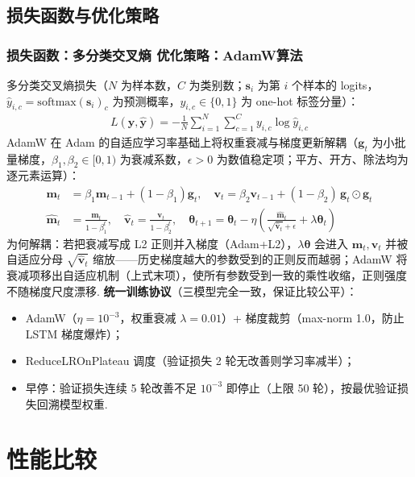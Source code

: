 \documentclass{模版}
\begin{document}
\subsection{损失函数与优化策略}
\begin{frame}\frametitle{损失函数：多分类交叉熵 \quad 优化策略：AdamW算法}
{\fontsize{9pt}{11pt}\selectfont 多分类交叉熵损失（$N$ 为样本数，$C$ 为类别数；$\symbf{s}_i$ 为第 $i$ 个样本的 logits，$\hat{y}_{i,c}=\mathrm{softmax}(\symbf{s}_i)_c$ 为预测概率，$y_{i,c}\in\{0,1\}$ 为 one-hot 标签分量）：}
\begin{align*}
L(\symbf{y}, \hat{\symbf{y}}) = - \frac{1}{N} \sum_{i=1}^{N} \sum_{c=1}^{C} y_{i,c} \log \hat{y}_{i,c}
\end{align*}
{\fontsize{9pt}{11pt}\selectfont AdamW 在 Adam 的自适应学习率基础上将权重衰减与梯度更新解耦（$\symbf{g}_t$ 为小批量梯度，$\beta_1,\beta_2\in[0,1)$ 为衰减系数，$\epsilon>0$ 为数值稳定项；平方、开方、除法均为逐元素运算）：}
\begin{align*}
\symbf{m}_t &= \beta_1\symbf{m}_{t-1}+(1-\beta_1)\symbf{g}_t,\quad
\symbf{v}_t = \beta_2\symbf{v}_{t-1}+(1-\beta_2)\,\symbf{g}_t\odot\symbf{g}_t\\
\hat{\symbf{m}}_t &= \frac{\symbf{m}_t}{1-\beta_1^t},\quad
\hat{\symbf{v}}_t = \frac{\symbf{v}_t}{1-\beta_2^t},\quad
\symbf{\theta}_{t+1}=\symbf{\theta}_t-\eta\left(\frac{\hat{\symbf{m}}_t}{\sqrt{\hat{\symbf{v}}_t}+\epsilon}+\lambda\symbf{\theta}_t\right)
\end{align*}
{\fontsize{9pt}{11pt}\selectfont 为何解耦：若把衰减写成 L2 正则并入梯度（Adam+L2），$\lambda\symbf{\theta}$ 会进入 $\symbf{m}_t,\symbf{v}_t$ 并被自适应分母 $\sqrt{\hat{\symbf{v}}_t}$ 缩放——历史梯度越大的参数受到的正则反而越弱；AdamW 将衰减项移出自适应机制（上式末项），使所有参数受到一致的乘性收缩，正则强度不随梯度尺度漂移.}
\newpage
\textbf{统一训练协议}（三模型完全一致，保证比较公平）：
\begin{itemize}
    \fontsize{9pt}{11pt}\selectfont
    \item AdamW（$\eta=10^{-3}$，权重衰减 $\lambda=0.01$）+ 梯度裁剪（max-norm 1.0，防止 LSTM 梯度爆炸）；
    \item ReduceLROnPlateau 调度（验证损失 2 轮无改善则学习率减半）；
    \item 早停：验证损失连续 5 轮改善不足 $10^{-3}$ 即停止（上限 50 轮），按最优验证损失回溯模型权重.
\end{itemize}
\end{frame}
\section{性能比较}
\end{document}
